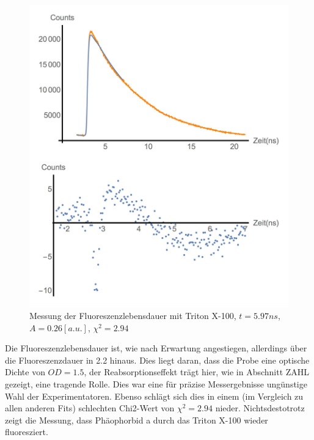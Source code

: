 \documentclass{article}
\begin{document}
\begin{figure}[h]
  \centering
  \includegraphics[width=\textwidth/2]{Bilder/FitTriton.jpg}
  \caption{Messung der Fluoreszenzlebensdauer mit Triton X-100, $t = 5.97ns$, $A = 0.26[a.u.]$, $\chi^2 = 2.94$}
\end{figure}

Die Fluoreszenzlebensdauer ist, wie nach Erwartung angestiegen, allerdings über die Fluoreszenzdauer in 2.2 hinaus. Dies liegt daran, dass
die Probe eine optische Dichte von $OD = 1.5$, der Reabsorptionseffekt trägt hier, wie in Abschnitt ZAHL gezeigt, eine tragende Rolle. Dies war
eine für präzise Messergebnisse ungünstige Wahl der Experimentatoren. Ebenso schlägt sich dies in einem (im Vergleich zu allen anderen Fits)
schlechten Chi2-Wert von $\chi^2=2.94$ nieder. Nichtsdestotrotz zeigt die Messung, dass Phäophorbid a durch das Triton X-100 wieder fluoresziert.
\end{document}

